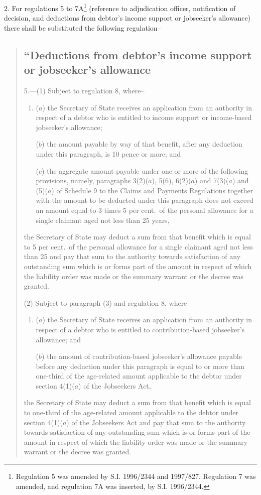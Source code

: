 \documentclass[12pt,a4paper]{article}
\begin{document}
2.  For regulations 5 to 7A\footnote{\frenchspacing Regulation 5 was amended by S.I. 1996/2344 and 1997/827. Regulation 7 was amended, and regulation 7A was inserted, by S.I. 1996/2344.} (reference to adjudication officer, notification of decision, and deductions from debtor’s income support or jobseeker’s allowance) there shall be substituted the following regulation–
\begin{quotation}
\subsection*{“Deductions from debtor’s income support or jobseeker’s allowance}

5.---(1)  Subject to regulation 8, where–
\begin{enumerate}\item[]
($a$) the Secretary of State receives an application from an authority in respect of a debtor who is entitled to income support or income-based jobseeker’s allowance;

($b$) the amount payable by way of that benefit, after any deduction under this paragraph, is 10 pence or more; and

($c$) the aggregate amount payable under one or more of the following provisions, namely, paragraphs 3(2)($a$), 5(6), 6(2)($a$)  and 7(3)($a$)  and (5)($a$)  of Schedule 9 to the Claims and Payments Regulations together with the amount to be deducted under this paragraph does not exceed an amount equal to 3 times 5 per cent.\ of the personal allowance for a single claimant aged not less than 25 years,
\end{enumerate}
the Secretary of State may deduct a sum from that benefit which is equal to 5 per cent.\ of the personal allowance for a single claimant aged not less than 25 and pay that sum to the authority towards satisfaction of any outstanding sum which is or forms part of the amount in respect of which the liability order was made or the summary warrant or the decree was granted.

(2) Subject to paragraph (3) and regulation 8, where–
\begin{enumerate}\item[]
($a$) the Secretary of State receives an application from an authority in respect of a debtor who is entitled to contribution-based jobseeker’s allowance; and

($b$) the amount of contribution-based jobseeker’s allowance payable before any deduction under this paragraph is equal to or more than one-third of the age-related amount applicable to the debtor under section 4(1)($a$)  of the Jobseekers Act,
\end{enumerate}
the Secretary of State may deduct a sum from that benefit which is equal to one-third of the age-related amount applicable to the debtor under section 4(1)($a$)  of the Jobseekers Act and pay that sum to the authority towards satisfaction of any outstanding sum which is or forms part of the amount in respect of which the liability order was made or the summary warrant or the decree was granted.


\end{quotation}
\end{document}
